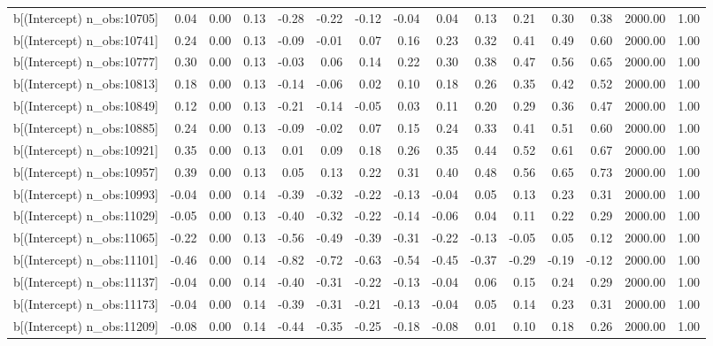 \begin{table}[ht]
\begin{tabular}{rrrrrrrrrrrrrrr}
  b[(Intercept) n\_obs:10705] & 0.04 & 0.00 & 0.13 & -0.28 & -0.22 & -0.12 & -0.04 & 0.04 & 0.13 & 0.21 & 0.30 & 0.38 & 2000.00 & 1.00 \\ 
  b[(Intercept) n\_obs:10741] & 0.24 & 0.00 & 0.13 & -0.09 & -0.01 & 0.07 & 0.16 & 0.23 & 0.32 & 0.41 & 0.49 & 0.60 & 2000.00 & 1.00 \\ 
  b[(Intercept) n\_obs:10777] & 0.30 & 0.00 & 0.13 & -0.03 & 0.06 & 0.14 & 0.22 & 0.30 & 0.38 & 0.47 & 0.56 & 0.65 & 2000.00 & 1.00 \\ 
  b[(Intercept) n\_obs:10813] & 0.18 & 0.00 & 0.13 & -0.14 & -0.06 & 0.02 & 0.10 & 0.18 & 0.26 & 0.35 & 0.42 & 0.52 & 2000.00 & 1.00 \\ 
  b[(Intercept) n\_obs:10849] & 0.12 & 0.00 & 0.13 & -0.21 & -0.14 & -0.05 & 0.03 & 0.11 & 0.20 & 0.29 & 0.36 & 0.47 & 2000.00 & 1.00 \\ 
  b[(Intercept) n\_obs:10885] & 0.24 & 0.00 & 0.13 & -0.09 & -0.02 & 0.07 & 0.15 & 0.24 & 0.33 & 0.41 & 0.51 & 0.60 & 2000.00 & 1.00 \\ 
  b[(Intercept) n\_obs:10921] & 0.35 & 0.00 & 0.13 & 0.01 & 0.09 & 0.18 & 0.26 & 0.35 & 0.44 & 0.52 & 0.61 & 0.67 & 2000.00 & 1.00 \\ 
  b[(Intercept) n\_obs:10957] & 0.39 & 0.00 & 0.13 & 0.05 & 0.13 & 0.22 & 0.31 & 0.40 & 0.48 & 0.56 & 0.65 & 0.73 & 2000.00 & 1.00 \\ 
  b[(Intercept) n\_obs:10993] & -0.04 & 0.00 & 0.14 & -0.39 & -0.32 & -0.22 & -0.13 & -0.04 & 0.05 & 0.13 & 0.23 & 0.31 & 2000.00 & 1.00 \\ 
  b[(Intercept) n\_obs:11029] & -0.05 & 0.00 & 0.13 & -0.40 & -0.32 & -0.22 & -0.14 & -0.06 & 0.04 & 0.11 & 0.22 & 0.29 & 2000.00 & 1.00 \\ 
  b[(Intercept) n\_obs:11065] & -0.22 & 0.00 & 0.13 & -0.56 & -0.49 & -0.39 & -0.31 & -0.22 & -0.13 & -0.05 & 0.05 & 0.12 & 2000.00 & 1.00 \\ 
  b[(Intercept) n\_obs:11101] & -0.46 & 0.00 & 0.14 & -0.82 & -0.72 & -0.63 & -0.54 & -0.45 & -0.37 & -0.29 & -0.19 & -0.12 & 2000.00 & 1.00 \\ 
  b[(Intercept) n\_obs:11137] & -0.04 & 0.00 & 0.14 & -0.40 & -0.31 & -0.22 & -0.13 & -0.04 & 0.06 & 0.15 & 0.24 & 0.29 & 2000.00 & 1.00 \\ 
  b[(Intercept) n\_obs:11173] & -0.04 & 0.00 & 0.14 & -0.39 & -0.31 & -0.21 & -0.13 & -0.04 & 0.05 & 0.14 & 0.23 & 0.31 & 2000.00 & 1.00 \\ 
  b[(Intercept) n\_obs:11209] & -0.08 & 0.00 & 0.14 & -0.44 & -0.35 & -0.25 & -0.18 & -0.08 & 0.01 & 0.10 & 0.18 & 0.26 & 2000.00 & 1.00 \\ 

\end{tabular}
\end{table}
